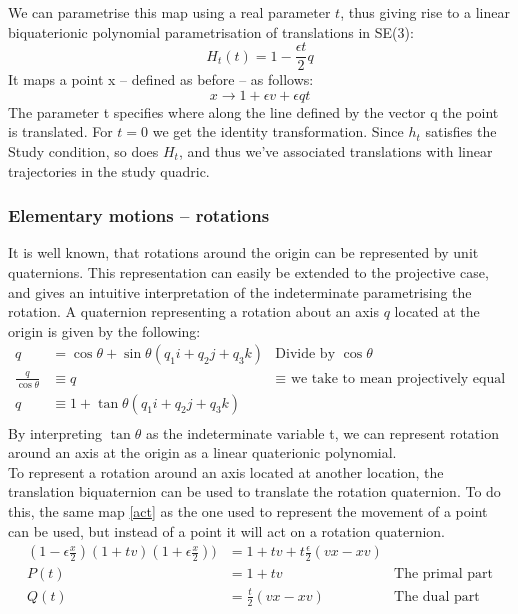We can parametrise this map using a real parameter $t$, thus giving rise to a linear biquaterionic polynomial parametrisation of translations in SE(3):
\begin{equation}
    H_t(t) = 1 - \frac{\epsilon t}{2}q
\end{equation}
It maps a point x -- defined as before -- as follows:
\begin{equation}
    x \rightarrow  1 + \epsilon v + \epsilon qt
\end{equation}
The parameter t specifies where along the line defined by the vector q the point is translated. For $t = 0$ we get the identity transformation.
Since $h_t$ satisfies the Study condition, so does  $H_t$, and thus we've associated translations with linear trajectories in the study quadric.
\clearpage
\subsubsection{Elementary motions -- rotations}
It is well known, that rotations around the origin can be represented by unit quaternions. This representation can easily be extended to the projective case, and gives an intuitive interpretation of the indeterminate parametrising the rotation. A quaternion representing a rotation about an axis $q$ located at the origin is given by the following:
\begin{equation}
    \begin{aligned}
        q&= \cos{\theta} + \sin{\theta}(q_1\mathit{i} + q_2\mathit{j} + q_3\mathit{k})&\mbox{Divide by $\cos{\theta}$}\\[1.25ex]
        \frac{q}{\cos{\theta}}&\equiv q&\mbox{$\equiv$ we take to mean projectively equal}\\[1.25ex]
        q&\equiv 1 + \tan{\theta}(q_1\mathit{i} + q_2\mathit{j} + q_3\mathit{k})&\mbox{}\\[1.25ex]
    \end{aligned}
\end{equation}
By interpreting $\tan{\theta}$ as the indeterminate variable t, we can represent rotation around an axis at the origin as a linear quaterionic polynomial. \\
To represent a rotation around an axis located at another location, the translation biquaternion can be used to translate the rotation quaternion\cite{Siegele_2021}. To do this, the same map \ref{act} as the one used to represent the movement of a point can be used, but instead of a point it will act on a rotation quaternion. 
\begin{equation}
    \label{rottr}
    \begin{aligned}
        (1-\epsilon \frac{x}{2})(1+tv)(1+\epsilon \frac{x}{2}))   &= 1 + tv +t\frac{\epsilon}{2}(vx-xv)&\mbox{}\\[1.25ex]
        P(t)&= 1 + tv&\mbox{The primal part}\\[1.25ex]
        Q(t)&= \frac{t}{2}(vx-xv)&\mbox{The dual part}\\[1.25ex]
    \end{aligned}
\end{equation}
